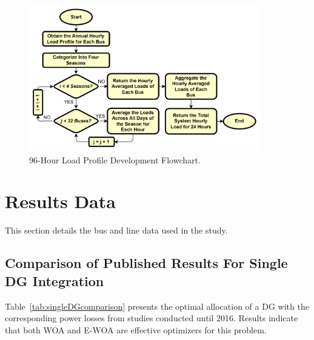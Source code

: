 \documentclass[12pt]{article}
\begin{document}
	\begin{figure}[htbp]
		\centerline{\includegraphics[width=0.9\textwidth]{96hourchart.png}}
		\caption{96-Hour Load Profile Development Flowchart.}
		\label{fig:96hourchartdev}
	\end{figure}
	
	\section{Results Data}
	This section details the bus and line data used in the study.
	
	\subsection{Comparison of Published Results For Single DG Integration}
	
	Table~\ref{tab:singleDGcomparison} presents the optimal allocation of a DG with the corresponding power losses from studies conducted until 2016. Results indicate that both WOA and E-WOA are effective optimizers for this problem.
	
\end{document}
